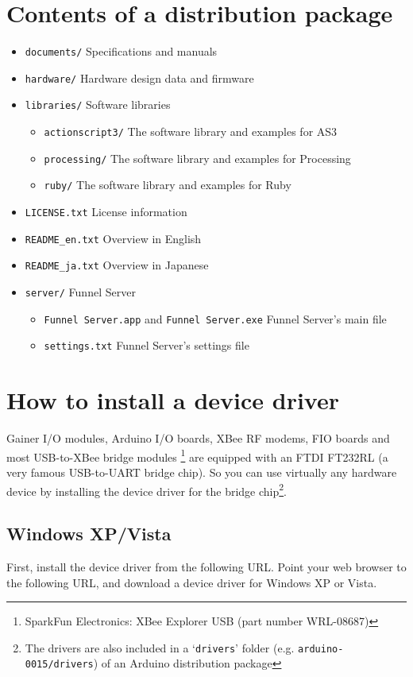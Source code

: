 \documentclass[9pt]{jsarticle}
\begin{document}
\section{Contents of a distribution package}
\begin{itemize}
\item \texttt{documents/} Specifications and manuals
\item \texttt{hardware/} Hardware design data and firmware
\item \texttt{libraries/} Software libraries
	\begin{itemize}
	\item \texttt{actionscript3/} The software library and examples for AS3
	\item \texttt{processing/} The software library and examples for Processing
	\item \texttt{ruby/} The software library and examples for Ruby
	\end{itemize}
\item \texttt{LICENSE.txt} License information
\item \texttt{README\_en.txt} Overview in English
\item \texttt{README\_ja.txt} Overview in Japanese
\item \texttt{server/} Funnel Server
	\begin{itemize}
	\item \texttt{Funnel Server.app} and \texttt{Funnel Server.exe} Funnel Server's main file
	\item \texttt{settings.txt} Funnel Server's settings file
	\end{itemize}
\end{itemize}

\section{How to install a device driver}
Gainer I/O modules, Arduino I/O boards, XBee RF modems, FIO boards and most USB-to-XBee bridge modules \footnote{SparkFun Electronics: XBee Explorer USB (part number WRL-08687)} are equipped with an FTDI FT232RL (a very famous USB-to-UART bridge chip). So you can use virtually any hardware device by installing the device driver for the bridge chip\footnote{The drivers are also included in a `\texttt{drivers}' folder  (e.g. \texttt{arduino-0015/drivers}) of an Arduino distribution package}.

\subsection{Windows XP/Vista}
First, install the device driver from the following URL. Point your web browser to the following URL, and download a device driver for Windows XP or Vista.
\end{document}
